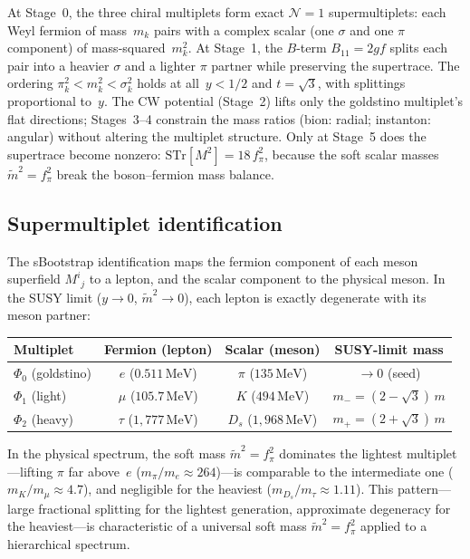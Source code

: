 \documentclass[12pt,a4paper]{article}
\newcommand{\MeV}{\,\text{MeV}}
\newcommand{\fpi}{f_\pi}
\begin{document}
At Stage~0, the three chiral multiplets form exact
$\mathcal{N}=1$ supermultiplets: each Weyl fermion of mass~$m_k$
pairs with a complex scalar (one $\sigma$ and one $\pi$ component)
of mass-squared~$m_k^2$. At Stage~1, the $B$-term
$B_{11} = 2gf$ splits each pair into a heavier $\sigma$ and a lighter
$\pi$ partner while preserving the supertrace. The ordering
$\pi_k^2 < m_k^2 < \sigma_k^2$ holds at all~$y < 1/2$
and $t = \sqrt{3}$, with splittings proportional to~$y$.
The CW potential (Stage~2) lifts only the goldstino multiplet's
flat directions; Stages~3--4 constrain the mass ratios
(bion: radial; instanton: angular) without altering the
multiplet structure. Only at Stage~5 does the supertrace become
nonzero: $\mathrm{STr}[M^2] = 18\,\fpi^2$, because the soft
scalar masses $\tilde m^2 = \fpi^2$ break the
boson--fermion mass balance.

\subsection{Supermultiplet identification}

The sBootstrap identification maps the fermion component of each
meson superfield $M^i{}_j$ to a lepton, and the scalar component
to the physical meson. In the SUSY limit ($y \to 0$,
$\tilde m^2 \to 0$), each lepton is exactly degenerate with its
meson partner:

\begin{center}
\begin{tabular}{lccc}
\toprule
Multiplet & Fermion (lepton) & Scalar (meson) & SUSY-limit mass \\
\midrule
$\Phi_0$ (goldstino) & $e$ ($0.511\MeV$)
  & $\pi$ ($135\MeV$) & $\to 0$ (seed) \\
$\Phi_1$ (light) & $\mu$ ($105.7\MeV$)
  & $K$ ($494\MeV$) & $m_- = (2{-}\sqrt{3})\,m$ \\
$\Phi_2$ (heavy) & $\tau$ ($1{,}777\MeV$)
  & $D_s$ ($1{,}968\MeV$) & $m_+ = (2{+}\sqrt{3})\,m$ \\
\bottomrule
\end{tabular}
\end{center}

\noindent
In the physical spectrum, the soft mass $\tilde m^2 = \fpi^2$
dominates the lightest multiplet---lifting $\pi$ far above~$e$
($m_\pi/m_e \approx 264$)---is comparable to the intermediate
one ($m_K/m_\mu \approx 4.7$), and negligible for the heaviest
($m_{D_s}/m_\tau \approx 1.11$).
This pattern---large fractional splitting for the lightest
generation, approximate degeneracy for the heaviest---is
characteristic of a universal soft mass $\tilde m^2 = \fpi^2$
applied to a hierarchical spectrum.
\end{document}
